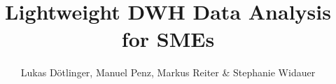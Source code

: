 \usepackage{lmodern}
\usepackage[english]{babel}

\usepackage{fontspec}

\usepackage{multicol}

\usepackage{listings}

\usepackage{graphicx}
\graphicspath{{assets/}}

\title{Lightweight DWH Data Analysis for SMEs}
\author{Lukas Dötlinger, Manuel Penz, Markus Reiter \& Stephanie Widauer}
